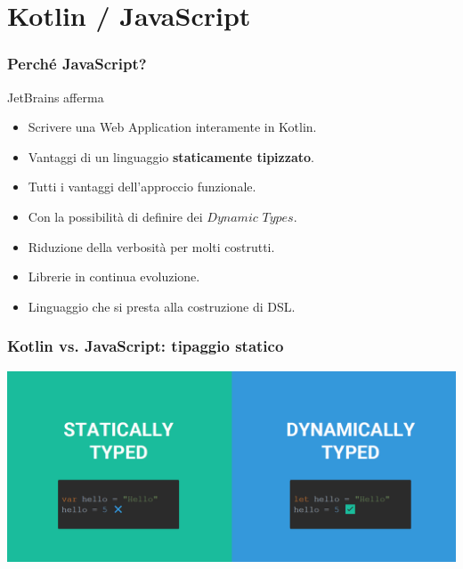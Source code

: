    \section{Kotlin / JavaScript}
    \begin{frame}
      \frametitle{Perché JavaScript?}
      \begin{block}{JetBrains afferma}
        \begin{itemize}[<+->]
          \item Scrivere una Web Application interamente in Kotlin.
          \medskip
          \item Vantaggi di un linguaggio \textbf{staticamente tipizzato}.
          \medskip
          \item Tutti i vantaggi dell'approccio funzionale.
          \medskip
          \item Con la possibilità di definire dei $Dynamic$ $Types$.
          \medskip
          \item Riduzione della verbosità per molti costrutti.
          \medskip
          \item Librerie in continua evoluzione.
          \medskip
          \item Linguaggio che si presta alla costruzione di DSL.
          \medskip
        \end{itemize}
      \end{block}
    \end{frame}

    \begin{frame}
      \frametitle{Kotlin vs. JavaScript: tipaggio statico}
      \begin{center}
        \includegraphics[scale=0.35]{StatVSDinPNG}
      \end{center}
    \end{frame}

